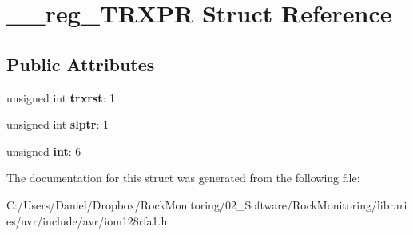 \hypertarget{struct____reg___t_r_x_p_r}{}\section{\+\_\+\+\_\+reg\+\_\+\+T\+R\+X\+PR Struct Reference}
\label{struct____reg___t_r_x_p_r}
\subsection*{Public Attributes}
\begin{DoxyCompactItemize}
\item 
unsigned int {\bfseries trxrst}\+: 1\hypertarget{struct____reg___t_r_x_p_r_aaae1b41cf0c85a9c664f020600d45ca9}{}\label{struct____reg___t_r_x_p_r_aaae1b41cf0c85a9c664f020600d45ca9}

\item 
unsigned int {\bfseries slptr}\+: 1\hypertarget{struct____reg___t_r_x_p_r_aabc2d9d31a8590913144c28fd9da2c35}{}\label{struct____reg___t_r_x_p_r_aabc2d9d31a8590913144c28fd9da2c35}

\item 
unsigned {\bfseries int}\+: 6\hypertarget{struct____reg___t_r_x_p_r_a33eda218369d478664bb5c89f57d7039}{}\label{struct____reg___t_r_x_p_r_a33eda218369d478664bb5c89f57d7039}

\end{DoxyCompactItemize}


The documentation for this struct was generated from the following file\+:\begin{DoxyCompactItemize}
\item 
C\+:/\+Users/\+Daniel/\+Dropbox/\+Rock\+Monitoring/02\+\_\+\+Software/\+Rock\+Monitoring/libraries/avr/include/avr/iom128rfa1.\+h\end{DoxyCompactItemize}
